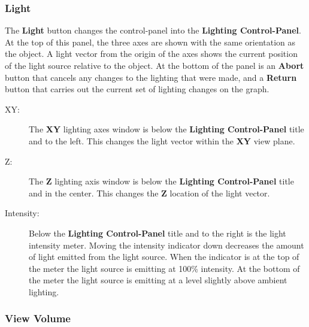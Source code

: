 \subsubsection{Light}

%
%
%

The {\bf Light} button changes the control-panel into the
{\bf Lighting Control-Panel}.  At the top of this panel, the three axes
are shown with the same orientation as the object.  A light vector from
the origin of the axes shows the current position of the light source
relative to the object.  At the bottom of the panel is an {\bf Abort}
button that cancels any changes to the lighting that were made, and a
{\bf Return} button that carries out the current set of lighting changes
on the graph.
%
\begin{description}
%
\item[XY:]  The {\bf XY} lighting axes window is below the
{\bf Lighting Control-Panel} title and to the left.
This changes the light vector within the {\bf XY} view plane.
%
\item[Z:]  The {\bf Z} lighting axis window is below the
{\bf Lighting Control-Panel} title and in the center.  This
changes the {\bf Z}
location of the light vector.
%
\item[Intensity:]
Below the {\bf Lighting Control-Panel} title
and to the right is the light intensity meter.
Moving the intensity indicator down decreases the amount of
light emitted from the light source.
When the indicator is at the top of the meter the light source is
emitting at 100\% intensity.
At the bottom of the meter the light source is emitting at a level
slightly above ambient lighting.
\end{description}

\subsubsection{View Volume}

